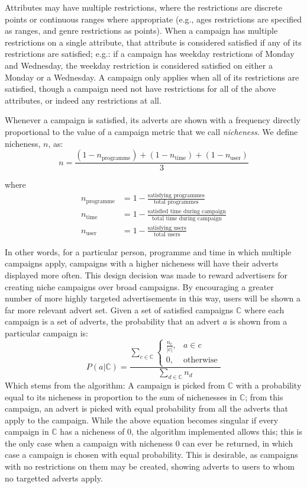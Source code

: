 	Attributes may have multiple restrictions, where the restrictions are discrete points or continuous ranges where appropriate (e.g., ages restrictions are specified as ranges, and genre restrictions as points). When a campaign has multiple restrictions on a single attribute, that attribute is considered satisfied if any of its restrictions are satisfied; e.g.: if a campaign has weekday restrictions of Monday and Wednesday, the weekday restriction is considered satisfied on either a Monday or a Wednesday. A campaign only applies when all of its restrictions are satisfied, though a campaign need not have restrictions for all of the above attributes, or indeed any restrictions at all.

	Whenever a campaign is satisfied, its adverts are shown with a frequency directly proportional to the value of a campaign metric that we call \textit{nicheness}. We define nicheness, $n$, as:
	$$
		n = \frac{(1-n_\text{programme}) + (1-n_\text{time}) + (1-n_\text{user})}{3}
	$$

	where
	\begin{align*}
		n_\text{programme} &= 1 - \frac{\text{satisfying programmes}}{\text{total programmes}} \\
		n_\text{time} &= 1 - \frac{\text{satisfied time during campaign}}{\text{total time during campaign}} \\
		n_\text{user} &= 1 - \frac{\text{satisfying users}}{\text{total users}}
	\end{align*}

	In other words, for a particular person, programme and time in which multiple campaigns apply, campaigns with a higher nicheness will have their adverts displayed more often. This design decision was made to reward advertisers for creating niche campaigns over broad campaigns. By encouraging a greater number of more highly targeted advertisements in this way, users will be shown a far more relevant advert set. Given a set of satisfied campaigns $\mathbb{C}$ where each campaign is a set of adverts, the probability that an advert $a$ is shown from a particular campaign is:
	$$
		P(a|\mathbb{C}) =
		\frac{
			\displaystyle \sum_{c \in \mathbb{C}}
			\begin{cases}
				\frac{n_c}{\left|c\right|}, & a \in c \\
				0, & \text{otherwise}
			\end{cases}
		}{
			\displaystyle \sum_{d \in \mathbb{C}} n_d
		}
	$$
Which stems from the algorithm: A campaign is picked from $\mathbb{C}$ with a probability equal to its nicheness in proportion to the sum of nichenesses in $\mathbb{C}$; from this campaign, an advert is picked with equal probability from all the adverts that apply to the campaign. While the above equation becomes singular if every campaign in $\mathbb{C}$ has a nicheness of 0, the algorithm implemented allows this; this is the only case when a campaign with nicheness 0 can ever be returned, in which case a campaign is chosen with equal probability. This is desirable, as campaigns with no restrictions on them may be created, showing adverts to users to whom no targetted adverts apply.

